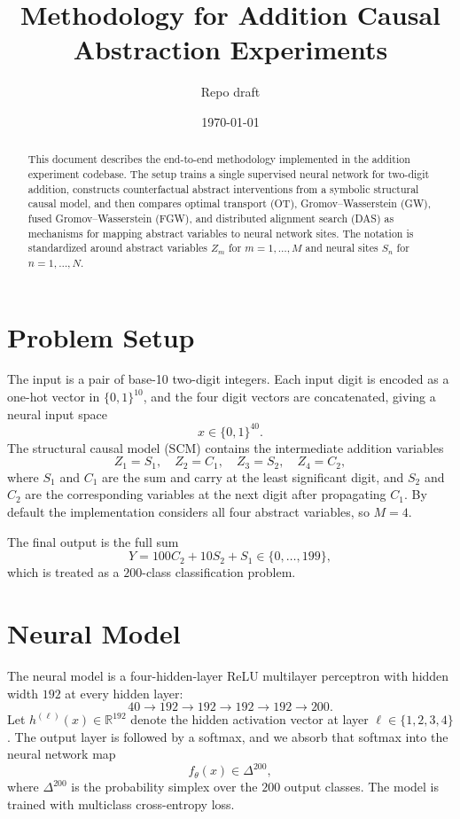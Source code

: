 \documentclass[11pt]{article}
\title{Methodology for Addition Causal Abstraction Experiments}
\author{Repo draft}
\date{\today}
\newcommand{\R}{\mathbb{R}}
\begin{document}
\maketitle

\begin{abstract}
This document describes the end-to-end methodology implemented in the addition experiment codebase. The setup trains a single supervised neural network for two-digit addition, constructs counterfactual abstract interventions from a symbolic structural causal model, and then compares optimal transport (OT), Gromov--Wasserstein (GW), fused Gromov--Wasserstein (FGW), and distributed alignment search (DAS) as mechanisms for mapping abstract variables to neural network sites. The notation is standardized around abstract variables $Z_m$ for $m=1,\dots,M$ and neural sites $S_n$ for $n=1,\dots,N$.
\end{abstract}

\section{Problem Setup}
The input is a pair of base-10 two-digit integers. Each input digit is encoded as a one-hot vector in $\{0,1\}^{10}$, and the four digit vectors are concatenated, giving a neural input space
\[
x \in \{0,1\}^{40}.
\]
The structural causal model (SCM) contains the intermediate addition variables
\[
Z_1 = S_1,\quad Z_2 = C_1,\quad Z_3 = S_2,\quad Z_4 = C_2,
\]
where $S_1$ and $C_1$ are the sum and carry at the least significant digit, and $S_2$ and $C_2$ are the corresponding variables at the next digit after propagating $C_1$. By default the implementation considers all four abstract variables, so $M=4$.

The final output is the full sum
\[
Y = 100 C_2 + 10 S_2 + S_1 \in \{0,\dots,199\},
\]
which is treated as a $200$-class classification problem.

\section{Neural Model}
The neural model is a four-hidden-layer ReLU multilayer perceptron with hidden width $192$ at every hidden layer:
\[
40 \rightarrow 192 \rightarrow 192 \rightarrow 192 \rightarrow 192 \rightarrow 200.
\]
Let $h^{(\ell)}(x) \in \R^{192}$ denote the hidden activation vector at layer $\ell \in \{1,2,3,4\}$. The output layer is followed by a softmax, and we absorb that softmax into the neural network map
\[
f_\theta(x) \in \Delta^{200},
\]
where $\Delta^{200}$ is the probability simplex over the $200$ output classes. The model is trained with multiclass cross-entropy loss.
\end{document}
